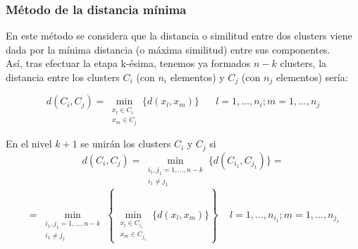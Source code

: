\documentclass[letterpaper,12pt, spanish]{article}
\begin{document}
 \subsubsection*{Método de la distancia mínima}
 
 En este método se considera que la distancia o similitud entre dos clusters viene dada por la mínima distancia (o máxima similitud) entre sus componentes.
 \ \\
 Así, tras efectuar la etapa k-ésima, tenemos ya formados $n-k$ clusters, la distancia entre los clusters $C_{i}$ (con $n_{i}$ elementos) y $C_{j}$ (con $n_{j}$ elementos) sería:
 
$$d(C_{i},C_{j})= \min_{\substack {x_{l}\in C_{i}\\ x_{m}\in C_{j}}}\{d(x_{l},x_{m})\} \,\,\,\,\,\,\,\,\,\, l=1,...,n_{i}; m=1,...,n_{j}$$   
 
En el nivel $k+1$ se unirán los clusters $C_{i}$ y $C_{j}$ si	
$$d(C_{i},C_{j})= \min_{\substack {i_{1},j_{1}=1,...,n-k\\ i_{1}\neq j_{1}}} \{d(C_{i_{1}},C_{j_{1}})\}=$$
$$=\min_{\substack{i_{1},j_{1}=1,...,n-k\\ i_{1}\neq j_{1}}} \left\{\min_{\substack{x_{l}\in C_{i_{1}}\\ x_{m}\in C_{j_{1}}}} \{d(x_{l},x_{m})\}\right\} \,\,\,\,\,\,\, l=1,...,n_{i_{1}}; m=1,...,n_{j_{1}}$$

\end{document}
